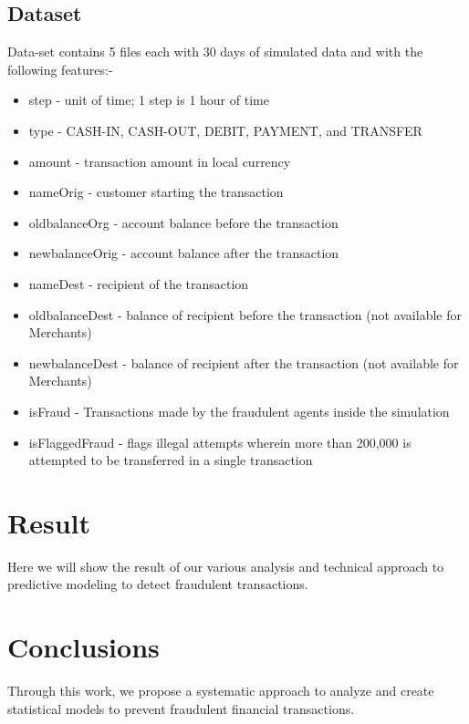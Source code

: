 \documentclass[letterpaper,12pt]{article}
\begin{document}
\subsection{Dataset}
Data-set contains 5 files each with 30 days of simulated data and with the following features:-
\begin{itemize}
    \item step - unit of time; 1 step is 1 hour of time
    \item type - CASH-IN, CASH-OUT, DEBIT, PAYMENT, and TRANSFER
    \item amount - transaction amount in local currency
    \item nameOrig - customer starting the transaction
    \item oldbalanceOrg - account balance before the transaction
    \item newbalanceOrig - account balance after the transaction
    \item nameDest - recipient of the transaction
    \item oldbalanceDest - balance of recipient before the transaction (not available for Merchants)
    \item newbalanceDest - balance of recipient after the transaction (not available for Merchants)
    \item isFraud - Transactions made by the fraudulent agents inside the simulation
    \item isFlaggedFraud - flags illegal attempts wherein more than 200,000 is attempted to be transferred in a single transaction
\end{itemize}



\section{Result}
Here we will show the result of our various analysis and technical approach to predictive modeling to detect fraudulent transactions.

\section{Conclusions}
Through this work, we propose a systematic approach to analyze and create statistical models to prevent fraudulent financial transactions.
\end{document}
